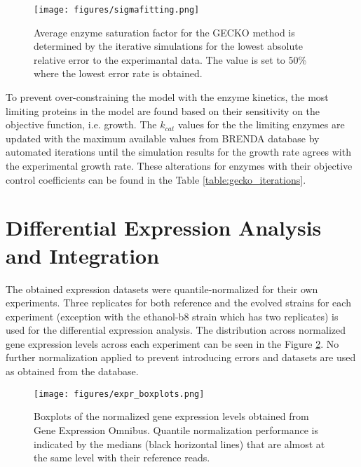 \begin{figure}[H]
  \begin{center}
    \texttt{[image: figures/sigmafitting.png]}
    \caption[Average enzyme saturation factor for the GECKO method is determined by the iterative simulations for the lowest absolute relative error to the experimantal data]{Average enzyme saturation factor for the GECKO method is determined by the iterative simulations for the lowest absolute relative error to the experimantal data. The value is set to 50\% where the lowest error rate is obtained.}
    \label{fig:sigma_fitting}
  \end{center}
\end{figure}

To prevent over-constraining the model with the enzyme kinetics, the most limiting proteins in the model are found based on their sensitivity on the objective function, i.e. growth. The $k_{cat}$ values for the the limiting enzymes are updated with the maximum available values from BRENDA\cite{jeske2019brenda} database by automated iterations until the simulation results for the growth rate agrees with the experimental growth rate. These alterations for enzymes with their objective control coefficients can be found in the Table \ref{table:gecko_iterations}.



\vspace{-0.5cm}
\section{Differential Expression Analysis and Integration}

The obtained expression datasets were quantile-normalized for their own experiments. Three replicates for both reference and the evolved strains for each experiment (exception with the ethanol-b8 strain which has two replicates) is used for the differential expression analysis. The distribution across normalized gene expression levels across each experiment can be seen in the Figure \ref{fig:expr_boxplot}. No further normalization applied to prevent introducing errors and datasets are used as obtained from the database.

\begin{figure}[H]
  \begin{center}
  \texttt{[image: figures/expr\_boxplots.png]}
  \caption[Boxplots of the normalized gene expression levels]{Boxplots of the normalized gene expression levels obtained from Gene Expression Omnibus. Quantile normalization performance is indicated by the medians (black horizontal lines) that are almost at the same level with their reference reads.}
  \label{fig:expr_boxplot}
  \end{center}
\end{figure}

